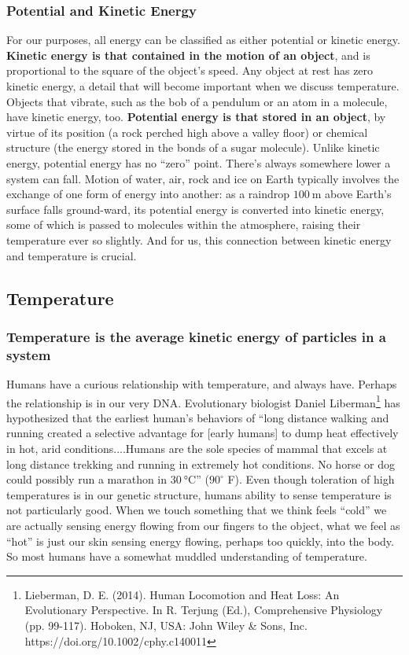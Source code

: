 \subsubsection{Potential and Kinetic Energy}
For our purposes, all energy can be classified as either potential or kinetic energy. \textbf{Kinetic energy is that contained in the motion of an object}, and is proportional to the square of the object's speed. Any object at rest has zero kinetic energy, a detail that will become important when we discuss temperature. Objects that vibrate, such as the bob of a pendulum or an atom in a molecule, have kinetic energy, too. \textbf{Potential energy is that stored in an object}, by virtue of its position (a rock perched high above a valley floor) or chemical structure (the energy stored in the bonds of a sugar molecule). Unlike kinetic energy, potential energy has no ``zero'' point. There's always somewhere lower a system can fall. Motion of water, air, rock and ice on Earth typically involves the exchange of one form of energy into another: as a raindrop $\SI{100}{\meter}$ above Earth's surface falls ground-ward, its potential energy is converted into kinetic energy, some of which is passed to molecules within the atmosphere, raising their temperature ever so slightly. And for us, this connection between kinetic energy and temperature is crucial.

\subsection{Temperature}
\subsubsection{Temperature is the average kinetic energy of particles in a system}
Humans have a curious relationship with temperature, and always have. Perhaps the relationship is in our very DNA. Evolutionary biologist Daniel Liberman\footnote{Lieberman, D. E. (2014). Human Locomotion and Heat Loss: An Evolutionary Perspective. In R. Terjung (Ed.), Comprehensive Physiology (pp. 99-117). Hoboken, NJ, USA: John Wiley \& Sons, Inc. https://doi.org/10.1002/cphy.c140011} has hypothesized that the earliest human's behaviors of ``long distance walking and running created a selective advantage for [early humans] to dump heat effectively in hot, arid conditions....Humans are the sole species of mammal that excels at long distance trekking and running in extremely hot conditions. No horse or dog could possibly run a marathon in $\SI{30}{\degreeCelsius}$'' ($90^{\circ}$ F). Even though toleration of high temperatures is in our genetic structure, humans ability to sense temperature is not particularly good. When we touch something that we think feels ``cold'' we are actually sensing energy flowing from our fingers to the object, what we feel as ``hot'' is just our skin sensing energy flowing, perhaps too quickly, into the body. So most humans have a somewhat muddled understanding of temperature.\\

